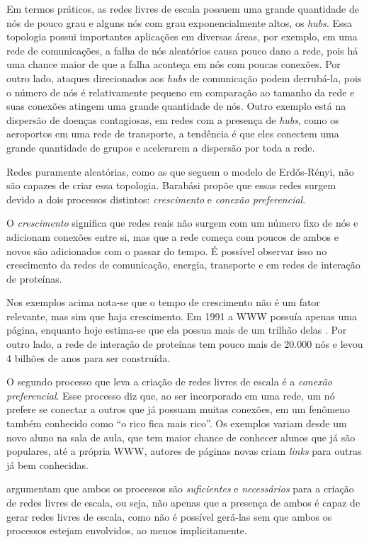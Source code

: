 \documentclass[12pt,a4paper]{article}
\theoremstyle{hypo}
\begin{document}
Em termos práticos, as redes livres de escala possuem uma grande quantidade de nós de pouco grau e alguns nós com grau exponencialmente altos, os \textit{hubs}. Essa topologia possui importantes aplicações em diversas áreas, por exemplo, em uma rede de comunicações, a falha de nós aleatórios causa pouco dano a rede, pois há uma chance maior de que a falha aconteça em nós com poucas conexões. Por outro lado, ataques direcionados aos \textit{hubs} de comunicação podem derrubá-la, pois o número de nós é relativamente pequeno em comparação ao tamanho da rede e suas conexões atingem uma grande quantidade de nós. Outro exemplo está na dispersão de doenças contagiosas, em redes com a presença de \textit{hubs}, como os aeroportos em uma rede de transporte, a tendência é que eles conectem uma grande quantidade de grupos e acelerarem a dispersão por toda a rede.

Redes puramente aleatórias, como as que seguem o modelo de Erdős-Rényi, não são capazes de criar essa topologia. Barabási propõe que essas redes surgem devido a dois processos distintos: \textit{crescimento} e \textit{conexão preferencial}.

O \textit{crescimento} significa que redes reais não surgem com um número fixo de nós e adicionam conexões entre si, mas que a rede começa com poucos de ambos e novos são adicionados com o passar do tempo. É possível observar isso no crescimento da redes de comunicação, energia, transporte e em redes de interação de proteínas.

Nos exemplos acima nota-se que o tempo de crescimento não é um fator relevante, mas sim que haja crescimento. Em 1991 a WWW possuía apenas uma página, enquanto hoje estima-se que ela possua mais de um trilhão delas \cite{Barabasi2016-rn}. Por outro lado, a rede de interação de proteínas tem pouco mais de 20.000 nós e levou 4 bilhões de anos para ser construída.

O segundo processo que leva a criação de redes livres de escala é a \textit{conexão preferencial}. Esse processo diz que, ao ser incorporado em uma rede, um nó prefere se conectar a outros que já possuam muitas conexões, em um fenômeno também conhecido como \enquote{o rico fica mais rico}. Os exemplos variam desde um novo aluno na sala de aula, que tem maior chance de conhecer alunos que já são populares, até a própria WWW, autores de páginas novas criam \textit{links} para outras já bem conhecidas.

 argumentam que ambos os processos são \textit{suficientes} e \textit{necessários} para a criação de redes livres de escala, ou seja, não apenas que a presença de ambos é capaz de gerar redes livres de escala, como não é possível gerá-las sem que ambos os processos estejam envolvidos, ao menos implicitamente.
\end{document}
